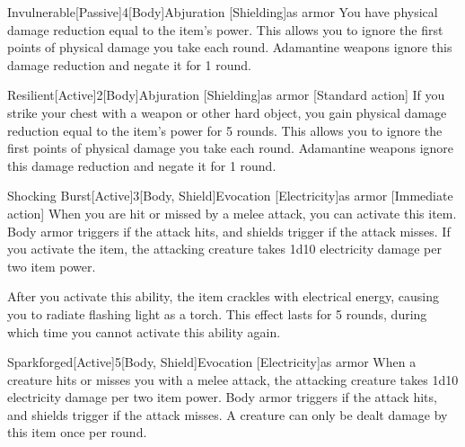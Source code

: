         \begin{magicitemdef}{Invulnerable}[Passive]{4}[Body]{Abjuration [Shielding]}{as armor}
             You have physical damage reduction equal to the item's power.
            This allows you to ignore the first points of physical damage you take each round.
            Adamantine weapons ignore this damage reduction and negate it for 1 round.
        \end{magicitemdef}

        \begin{magicitemdef}{Resilient}[Active]{2}[Body]{Abjuration [Shielding]}{as armor}
            [Standard action] If you strike your chest with a weapon or other hard object, you gain physical damage reduction equal to the item's power for 5 rounds.
            This allows you to ignore the first points of physical damage you take each round.
            Adamantine weapons ignore this damage reduction and negate it for 1 round.
        \end{magicitemdef}

        \begin{magicitemdef}{Shocking Burst}[Active]{3}[Body, Shield]{Evocation [Electricity]}{as armor}
            [Immediate action] When you are hit or missed by a melee attack, you can activate this item.
            Body armor triggers if the attack hits, and shields trigger if the attack misses.
            If you activate the item, the attacking creature takes 1d10 electricity damage per two item power.

            After you activate this ability, the item crackles with electrical energy, causing you to radiate flashing light as a torch.
            This effect lasts for 5 rounds, during which time you cannot activate this ability again.
        \end{magicitemdef}

        \begin{magicitemdef}{Sparkforged}[Active]{5}[Body, Shield]{Evocation [Electricity]}{as armor}
             When a creature hits or misses you with a melee attack, the attacking creature takes 1d10 electricity damage per two item power.
            Body armor triggers if the attack hits, and shields trigger if the attack misses.
            A creature can only be dealt damage by this item once per round.
        \end{magicitemdef}

